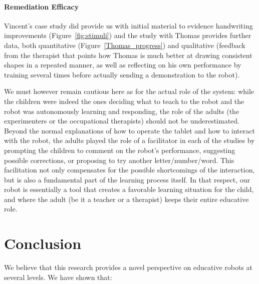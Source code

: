\documentclass{article}
\begin{document}
\paragraph{Remediation Efficacy} Vincent's case study did provide us with
initial material to evidence handwriting improvements (Figure~\ref{fig:stimuli})
and the study with Thomas provides further data, both quantitative
(Figure~\ref{Thomas_progress}) and qualitative (feedback from the therapist that
points how Thomas is much better at drawing consistent shapes in a repeated manner,
as well as reflecting on his own performance by training several times before
actually sending a demonstration to the robot).

We must however remain cautious here as for the actual role of the system: while
the children were indeed the ones deciding what to teach to the robot and the
robot was autonomously learning and responding, the role of the adults (the
experimenters or the occupational therapists) should not be underestimated.
Beyond the normal explanations of how to operate the tablet and how to interact
with the robot, the adults played the role of a facilitator in each of the
studies by prompting the children to comment on the robot's performance,
suggesting possible corrections, or proposing to try another letter/number/word.
This facilitation not only compensates for the possible shortcomings of the interaction,
but is also a fundamental part of the learning process itself. In that respect,
our robot is essentially a tool that creates a favorable learning situation for
the child, and where the adult (be it a teacher or a therapist) keeps their entire
educative role.

\section{Conclusion}

We believe that this research provides a novel perspective on educative robots
at several levels. We have shown that:
\end{document}
